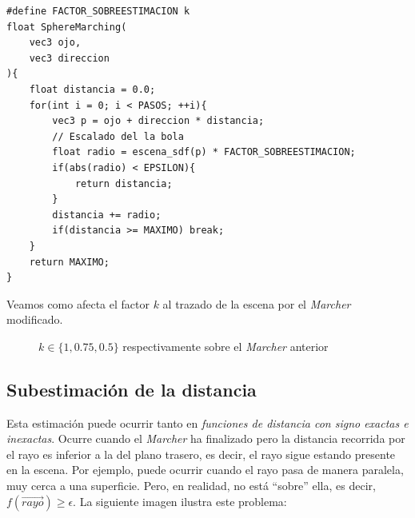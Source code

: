 \begin{lstlisting}
#define FACTOR_SOBREESTIMACION k
float SphereMarching(
    vec3 ojo, 
    vec3 direccion
){
    float distancia = 0.0;
    for(int i = 0; i < PASOS; ++i){
        vec3 p = ojo + direccion * distancia;
        // Escalado del la bola
        float radio = escena_sdf(p) * FACTOR_SOBREESTIMACION;
        if(abs(radio) < EPSILON){
            return distancia;
        }
        distancia += radio;
        if(distancia >= MAXIMO) break;
    }
    return MAXIMO;
}
\end{lstlisting}
Veamos como afecta el factor \(k\) al trazado de la escena por el \textit{Marcher} modificado.

\begin{figure}[H]
  \centering
  \captionsetup{justification=centering}%
  \hfill
  \hfill
  \caption{\(k\in\{1, 0.75, 0.5\}\) respectivamente sobre el \textit{Marcher} anterior}
\end{figure}


\subsection{Subestimación de la distancia}
Esta estimación puede ocurrir tanto en \textit{funciones de distancia con signo exactas e inexactas}. Ocurre cuando el \textit{Marcher} ha finalizado pero la distancia recorrida por el rayo es inferior a la del plano trasero, es decir, el rayo sigue estando presente en la escena. Por ejemplo, puede ocurrir cuando el rayo pasa de manera paralela, muy cerca a una superficie. Pero, en realidad, no está \enquote{sobre} ella, es decir, \(f(\Vec{rayo}) \ge \epsilon\). La siguiente imagen ilustra este problema:


